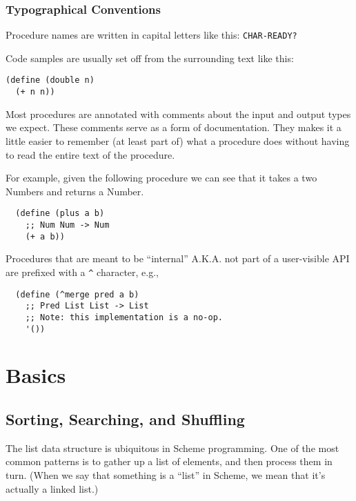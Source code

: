 \documentclass[12pt,openright,draft]{book}
\begin{document}
\section{Typographical Conventions}

Procedure names are written in capital letters like this:
\verb|CHAR-READY?|

Code samples are usually set off from the surrounding text like this:

\begin{verbatim}
(define (double n)
  (+ n n))
\end{verbatim}

Most procedures are annotated with comments about the input and output
types we expect.  These comments serve as a form of documentation.
They makes it a little easier to remember (at least part of) what a
procedure does without having to read the entire text of the
procedure.

For example, given the following procedure we can see that it takes a
two Numbers and returns a Number.

\begin{verbatim}
  (define (plus a b)
    ;; Num Num -> Num
    (+ a b))
\end{verbatim}

Procedures that are meant to be ``internal'' A.K.A. not part of a
user-visible API are prefixed with a \verb|^| character, e.g.,

\begin{verbatim}
  (define (^merge pred a b)
    ;; Pred List List -> List
    ;; Note: this implementation is a no-op.
    '())
\end{verbatim}


\mainmatter{}
\part{Basics}
\chapter{Sorting, Searching, and Shuffling}

The list data structure is ubiquitous in Scheme programming.  One of
the most common patterns is to gather up a list of elements, and then
process them in turn.  (When we say that something is a ``list'' in
Scheme, we mean that it's actually a linked list.)
\end{document}
